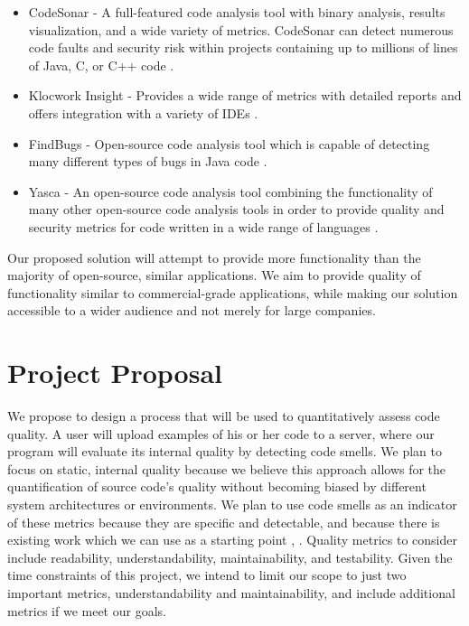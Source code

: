 \documentclass{sig-alternate}
\begin{document}
\begin{itemize}
\item CodeSonar - A full-featured code analysis tool with binary analysis, results visualization, and a wide variety of metrics. CodeSonar can detect numerous code faults and security risk within projects containing up to millions of lines of Java, C, or C++ code \cite{grammatech2013codesonar}.
\item Klocwork Insight - Provides a wide range of metrics with detailed reports and offers integration with a variety of IDEs \cite{klocwork2013insight}.
\item FindBugs - Open-source code analysis tool which is capable of detecting many different types of bugs in Java code \cite{pugh2013findbugs}.
\item Yasca - An open-source code analysis tool combining the functionality of many other open-source code analysis tools in order to provide quality and security metrics for code written in a wide range of languages \cite{scovetta2007yasca}.
\end{itemize}

Our proposed solution will attempt to provide more functionality than the majority of open-source, similar applications. We aim to provide quality of functionality similar to commercial-grade applications, while making our solution accessible to a wider audience and not merely for large companies.

\section{Project Proposal}
\label{sec:project_proposal}
We propose to design a process that will be used to quantitatively assess code quality. A user will upload examples of his or her code to a server, where our program will evaluate its internal quality by detecting code smells. We plan to focus on static, internal quality because we believe this approach allows for the quantification of source code's quality without becoming biased by different system architectures or environments. We plan to use code smells as an indicator of these metrics because they are specific and detectable, and because there is existing work which we can use as a starting point \cite{moha2009duchien}, \cite{palomba}. Quality metrics to consider include readability, understandability, maintainability, and testability. Given the time constraints of this project, we intend to limit our scope to just two important metrics, understandability and maintainability, and include additional metrics if we meet our goals. 
\end{document}
